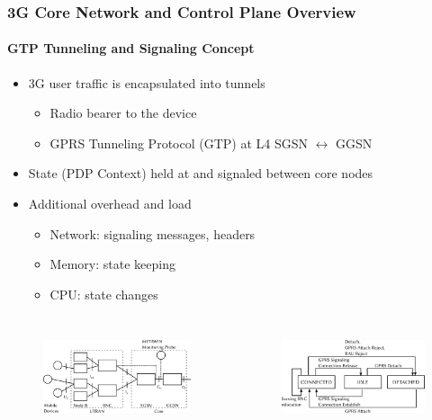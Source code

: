 \documentclass{beamer}
\begin{document}
\begin{frame}
	\frametitle{3G Core Network and Control Plane Overview}
    \framesubtitle{GTP Tunneling and Signaling Concept}

    \begin{itemize}
		\item 3G user traffic is encapsulated into tunnels
		\begin{itemize}
			\item Radio bearer to the device
			\item GPRS Tunneling Protocol (GTP) at L4 SGSN $\leftrightarrow$ GGSN
		\end{itemize}
		\item State (PDP Context) held at and signaled between core nodes
		\item Additional overhead and load
		\begin{itemize}
			\item Network: signaling messages, headers
			\item Memory: state keeping
			\item CPU: state changes
		\end{itemize}
	\end{itemize}

	\begin{columns}
			\vspace{-0.6cm}
			\begin{figure}	
				\includegraphics[height=2.8cm]{../../chapters/04-mobilenets/images/umts-network.pdf}
			\end{figure}

			\vspace{-0.6cm}
			\begin{figure}
				\includegraphics[height=2.8cm]{../../chapters/04-mobilenets/images/mm-3g-state-model.pdf}
			\end{figure}
	\end{columns}
\end{frame}
\end{document}
